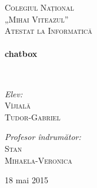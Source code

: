 \begin{titlepage}
\begin{center}

\textsc{\LARGE Colegiul Național \\[0.5cm] „Mihai Viteazul”}\\[1.5cm]

\textsc{\Large Atestat la Informatică}\\[0.5cm]

\HRule \\[0.4cm]
{ \Huge \bfseries chatbox \\[0.4cm] }

\HRule \\[1.5cm]

\noindent
\begin{minipage}[t]{0.4\textwidth}
\begin{flushleft} \large
\emph{Elev:}\\
\textsc{Vîjială\\Tudor-Gabriel}
\end{flushleft}
\end{minipage}
\begin{minipage}[b]{0.4\textwidth}
\begin{flushright} \large
\emph{Profesor îndrumător:} \\
\textsc{Stan\\ Mihaela-Veronica}
\end{flushright}
\end{minipage}

\vfill

{\small 18 mai 2015}

\end{center}
\end{titlepage}